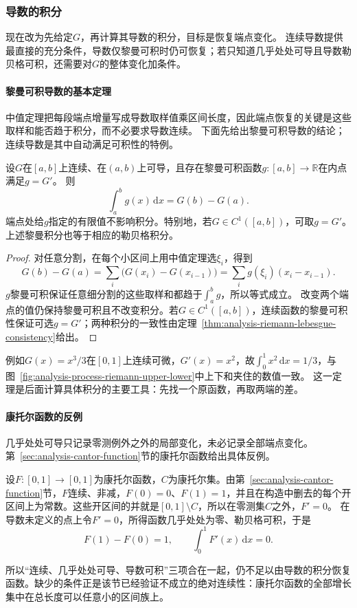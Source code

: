 \subsubsection{导数的积分}

现在改为先给定$G$，再计算其导数的积分，目标是恢复端点变化。
连续导数提供最直接的充分条件，导数仅黎曼可积时仍可恢复；若只知道几乎处处可导且导数勒贝格可积，还需要对$G$的整体变化加条件。

\paragraph{黎曼可积导数的基本定理}
中值定理把每段端点增量写成导数取样值乘区间长度，因此端点恢复的关键是这些取样和能否趋于积分，而不必要求导数连续。
下面先给出黎曼可积导数的结论；连续导数是其中自动满足可积性的特例。
\begin{theorem}[黎曼可积导数的端点公式]
\label{thm:analysis-riemann-derivative-ftc}
\label{thm:analysis-newton-leibniz-continuous}
设$G$在$[a,b]$上连续、在$(a,b)$上可导，且存在黎曼可积函数$g:[a,b]\to\mathbb R$在内点满足$g=G'$。
则
\[
 \int_a^bg(x)\,\mathrm dx=G(b)-G(a).
\]
端点处给$g$指定的有限值不影响积分。特别地，若$G\in C^1([a,b])$，可取$g=G'$。
上述黎曼积分也等于相应的勒贝格积分。
\end{theorem}
\begin{proof}
对任意分割，在每个小区间上用中值定理选$\xi_i$，得到
\[
 G(b)-G(a)=\sum_i\bigl(G(x_i)-G(x_{i-1})\bigr)
 =\sum_i g(\xi_i)(x_i-x_{i-1}).
\]
$g$黎曼可积保证任意细分割的这些取样和都趋于$\int_a^bg$，所以等式成立。
改变两个端点的值仍保持黎曼可积且不改变积分。若$G\in C^1([a,b])$，连续函数的黎曼可积性保证可选$g=G'$；两种积分的一致性由定理~\ref{thm:analysis-riemann-lebesgue-consistency}给出。
\end{proof}
例如$G(x)=x^3/3$在$[0,1]$上连续可微，$G'(x)=x^2$，故$\int_0^1x^2\,\mathrm dx=1/3$，与图~\ref{fig:analysis-process-riemann-upper-lower}中上下和夹住的数值一致。
这一定理是后面计算具体积分的主要工具：先找一个原函数，再取两端的差。

\paragraph{康托尔函数的反例}
几乎处处可导只记录零测例外之外的局部变化，未必记录全部端点变化。第~\ref{sec:analysis-cantor-function}节的康托尔函数给出具体反例。
\begin{example}[康托尔函数的导数积分不恢复端点差]
\label{ex:analysis-cantor-ftc-failure}
设$F:[0,1]\to[0,1]$为康托尔函数，$C$为康托尔集。由第~\ref{sec:analysis-cantor-function}节，$F$连续、非减，$F(0)=0$、$F(1)=1$，并且在构造中删去的每个开区间上为常数。这些开区间的并就是$[0,1]\setminus C$，所以在零测集$C$之外，$F'=0$。
在导数未定义的点上令$F'=0$，所得函数几乎处处为零、勒贝格可积，于是
\[
 F(1)-F(0)=1,\qquad \int_0^1F'(x)\,\mathrm dx=0.
\]
\end{example}
所以“连续、几乎处处可导、导数可积”三项合在一起，仍不足以由导数的积分恢复函数。缺少的条件正是该节已经验证不成立的绝对连续性：康托尔函数的全部增长集中在总长度可以任意小的区间族上。

